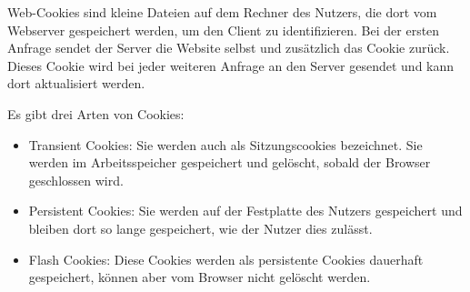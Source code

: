 
Web-Cookies sind kleine Dateien auf dem Rechner des Nutzers, die dort vom Webserver gespeichert werden, um den Client zu identifizieren. Bei der ersten Anfrage sendet der Server die Website selbst und zusätzlich das Cookie zurück. Dieses Cookie wird bei jeder weiteren Anfrage an den Server gesendet und kann dort aktualisiert werden. 

Es gibt drei Arten von Cookies:

\begin{itemize}
    \item Transient Cookies: Sie werden auch als Sitzungscookies bezeichnet. Sie werden im Arbeitsspeicher gespeichert und gelöscht, sobald der Browser geschlossen wird.
    \item Persistent Cookies: Sie werden auf der Festplatte des Nutzers gespeichert und bleiben dort so lange gespeichert, wie der Nutzer dies zulässt.
    \item Flash Cookies: Diese Cookies werden als persistente Cookies dauerhaft gespeichert, können aber vom Browser nicht gelöscht werden. 
\end{itemize}
\cite{w3Cookies}
